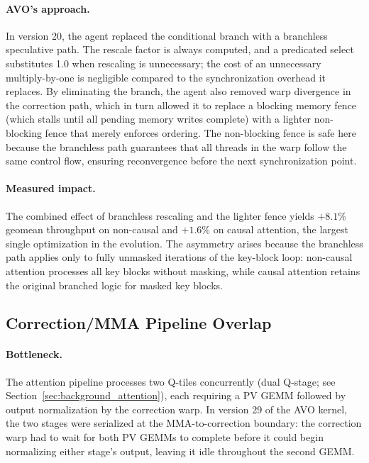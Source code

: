 \paragraph{AVO's approach.}
In version 20, the agent replaced the conditional branch with a branchless speculative path.
The rescale factor is always computed, and a predicated select substitutes 1.0 when rescaling is unnecessary; the cost of an unnecessary multiply-by-one is negligible compared to the synchronization overhead it replaces.
By eliminating the branch, the agent also removed warp divergence in the correction path, which in turn allowed it to replace a blocking memory fence (which stalls until all pending memory writes complete) with a lighter non-blocking fence that merely enforces ordering.
The non-blocking fence is safe here because the branchless path guarantees that all threads in the warp follow the same control flow, ensuring reconvergence before the next synchronization point.

\paragraph{Measured impact.}
The combined effect of branchless rescaling and the lighter fence yields $+8.1\%$ geomean throughput on non-causal and $+1.6\%$ on causal attention, the largest single optimization in the evolution.
The asymmetry arises because the branchless path applies only to fully unmasked iterations of the key-block loop: non-causal attention processes all key blocks without masking, while causal attention retains the original branched logic for masked key blocks.

\subsection{Correction/MMA Pipeline Overlap}
\label{sec:analysis_split}

\paragraph{Bottleneck.}
The attention pipeline processes two Q-tiles concurrently (dual Q-stage; see Section~\ref{sec:background_attention}), each requiring a PV GEMM followed by output normalization by the correction warp.
In version 29 of the AVO kernel, the two stages were serialized at the MMA-to-correction boundary: the correction warp had to wait for both PV GEMMs to complete before it could begin normalizing either stage's output, leaving it idle throughout the second GEMM.

